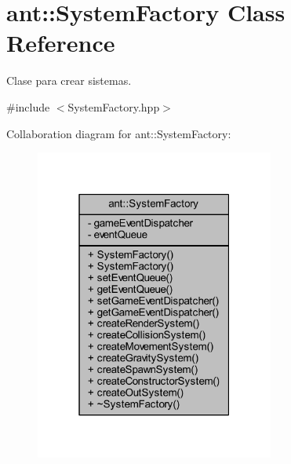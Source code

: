 \hypertarget{classant_1_1_system_factory}{\section{ant\+:\+:System\+Factory Class Reference}
\label{classant_1_1_system_factory}
}


Clase para crear sistemas.  




{\ttfamily \#include $<$System\+Factory.\+hpp$>$}



Collaboration diagram for ant\+:\+:System\+Factory\+:
\nopagebreak
\begin{figure}[H]
\begin{center}
\leavevmode
\includegraphics[width=223pt]{d9/d81/classant_1_1_system_factory__coll__graph}
\end{center}
\end{figure}
